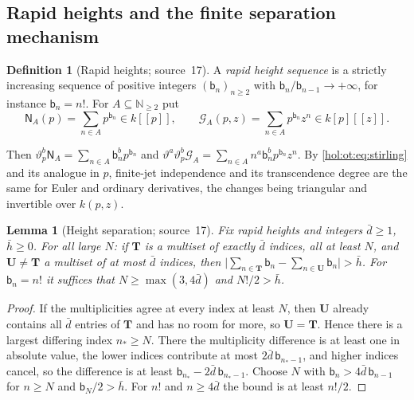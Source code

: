 \documentclass[11pt]{article}
\numberwithin{equation}{section}
\newtheorem{lemma}[theorem]{Lemma}
\theoremstyle{definition}
\newtheorem{definition}[theorem]{Definition}
\theoremstyle{remark}
\newcommand{\N}{\mathbb N}
\newcommand{\abs}[1]{\lvert#1\rvert}
\begin{document}
\subsection{Rapid heights and the finite separation mechanism}
\label{hol:fh:sub:finite}

\begin{definition}[Rapid heights; source~17]\label{hol:fh:def:rapid}
A \emph{rapid height sequence} is a strictly increasing sequence of positive
integers $(\mathsf b_n)_{n\ge2}$ with $\mathsf b_n/\mathsf b_{n-1}\to+\infty$,
for instance $\mathsf b_n=n!$. For $A\subseteq\N_{\ge2}$ put
\[
 \mathsf N_A(p)=\sum_{n\in A}p^{\mathsf b_n}\in k[[p]],\qquad
 \mathcal G_A(p,z)=\sum_{n\in A}p^{\mathsf b_n}z^n\in k[p][[z]] .
\]
\end{definition}

Then $\vartheta_p^b\mathsf N_A=\sum_{n\in A}\mathsf b_n^bp^{\mathsf b_n}$ and
$\vartheta^a\vartheta_p^b\mathcal G_A=\sum_{n\in A}n^a\mathsf b_n^bp^{\mathsf b_n}
z^n$. By \eqref{hol:ot:eq:stirling} and its analogue in $p$, finite-jet
independence and its transcendence degree are the same for Euler and ordinary
derivatives, the changes being triangular and invertible over $k(p,z)$.

\begin{lemma}[Height separation; source~17]\label{hol:fh:lem:sep}
Fix rapid heights and integers $\bar d\ge1$, $\bar h\ge0$. For all large $N$:
if $\mathbf T$ is a multiset of exactly $\bar d$ indices, all at least $N$, and
$\mathbf U\ne\mathbf T$ a multiset of at most $\bar d$ indices, then
$\abs{\sum_{n\in\mathbf T}\mathsf b_n-\sum_{n\in\mathbf U}\mathsf b_n}>\bar h$.
For $\mathsf b_n=n!$ it suffices that $N\ge\max(3,4\bar d)$ and $N!/2>\bar h$.
\end{lemma}

\begin{proof}
If the multiplicities agree at every index at least $N$, then $\mathbf U$
already contains all $\bar d$ entries of $\mathbf T$ and has no room for more,
so $\mathbf U=\mathbf T$. Hence there is a largest differing index $n_*\ge N$.
There the multiplicity difference is at least one in absolute value, the
lower indices contribute at most $2\bar d\,\mathsf b_{n_*-1}$, and higher
indices cancel, so the difference is at least $\mathsf b_{n_*}-2\bar d\,
\mathsf b_{n_*-1}$. Choose $N$ with $\mathsf b_n>4\bar d\,\mathsf b_{n-1}$ for
$n\ge N$ and $\mathsf b_N/2>\bar h$. For $n!$ and $n\ge4\bar d$ the bound is at
least $n!/2$.
\end{proof}
\end{document}

